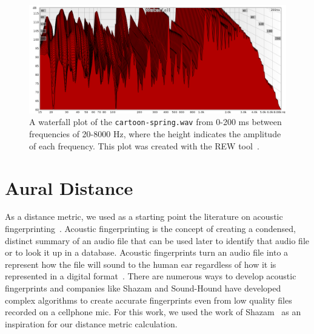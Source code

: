 
\begin{figure}[!ht]
\includegraphics[width=\textwidth]{figs/waterfall} 
\caption{A waterfall plot of the \texttt{cartoon-spring.wav} from 0-200 ms between frequencies of 20-8000 Hz, where the height indicates the amplitude of each frequency. This plot was created with the REW tool~\cite{REWTool}.}
\label{fig:waterfall}
\end{figure}

\section{Aural Distance}
\label{sec:distance}

As a distance metric, we used as a starting point the literature on acoustic fingerprinting~\cite{fingerprinting}.
Acoustic fingerprinting is the concept of creating a condensed, distinct summary of an audio file that can be used later to identify that audio file or to look it up in a database.
Acoustic fingerprints turn an audio file into a represent how the file will sound to the human ear regardless of how it is represented in a digital format~\cite{fingerprinting}.
There are numerous ways to develop acoustic fingerprints and companies like Shazam and Sound-Hound have developed complex algorithms to create accurate fingerprints even from low quality files recorded on a cellphone mic.
For this work, we used the work of Shazam~\cite{wang2003industrial} as an inspiration for our distance metric calculation.


